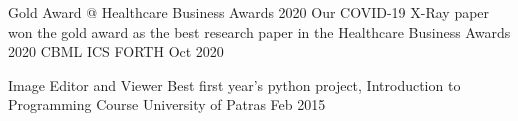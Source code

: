 



\begin{cvhonors}

  \cvhonor
    {Gold Award @ Healthcare Business Awards 2020} %
    {Our COVID-19 X-Ray paper \cite{tsiknakisinterpretable} won the gold award as the best research paper in the Healthcare Business Awards 2020} %
    {CBML ICS FORTH} %
    {Oct 2020} %

  \cvhonor
    {Image Editor and Viewer} %
    {Best first year's python project, Introduction to Programming Course} %
    {University of Patras} %
    {Feb 2015} %

\end{cvhonors}